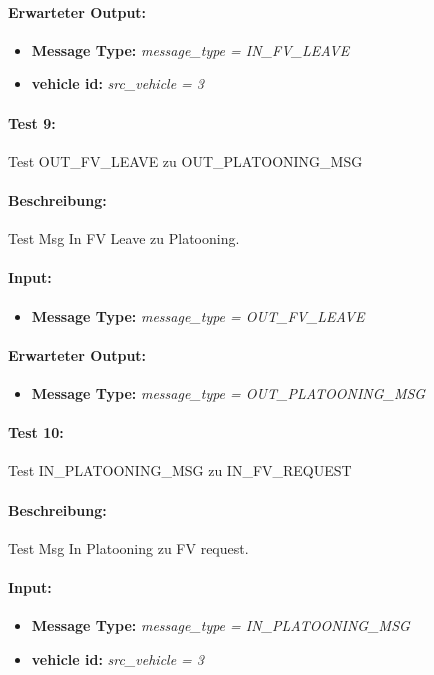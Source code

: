 \documentclass[a4paper, 12pt, titlepage]{scrartcl}
\begin{document}
{			\paragraph{Erwarteter Output:}
			\begin{itemize} \itemsep-0.5em
				\item \textbf{Message Type:} \emph{message\_type = IN\_FV\_LEAVE}
				\item \textbf{vehicle id:} \emph{src\_vehicle = 3}
			\end{itemize}
			
			\paragraph{Test 9:}{Test OUT\_FV\_LEAVE zu OUT\_PLATOONING\_MSG}
			\paragraph{Beschreibung:} Test Msg In FV Leave zu Platooning.
			\paragraph{Input:}
			\begin{itemize} \itemsep-0.5em
				\item \textbf{Message Type:} \emph{message\_type = OUT\_FV\_LEAVE}
			\end{itemize}
			\paragraph{Erwarteter Output:}
			\begin{itemize} \itemsep-0.5em
				\item \textbf{Message Type:} \emph{message\_type = OUT\_PLATOONING\_MSG}
			\end{itemize}

			\paragraph{Test 10:}{Test IN\_PLATOONING\_MSG zu IN\_FV\_REQUEST}
			\paragraph{Beschreibung:} Test Msg In Platooning zu FV request.
			\paragraph{Input:}
			\begin{itemize} \itemsep-0.5em
				\item \textbf{Message Type:} \emph{message\_type = IN\_PLATOONING\_MSG}
				\item \textbf{vehicle id:} \emph{src\_vehicle = 3}
			\end{itemize}
}
\end{document}
